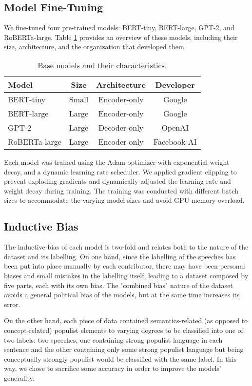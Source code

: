 \documentclass[11pt,twocolumn,letterpaper]{article}
\begin{document}
\subsection{Model Fine-Tuning}
We fine-tuned four pre-trained models: BERT-tiny, BERT-large, GPT-2, and RoBERTa-large. Table \ref{Table_1} provides an overview of these models, including their size, architecture, and the organization that developed them.

\begin{table}[H]
\begin{center}
\begin{tabular}{|l|c|c|c|}
\hline
Model & Size & Architecture & Developer\\
\hline\hline
BERT-tiny & Small & Encoder-only & Google\\
BERT-large & Large & Encoder-only & Google\\
GPT-2 & Large & Decoder-only & OpenAI\\
RoBERTa-large & Large & Encoder-only & Facebook AI\\
\hline
\end{tabular}
\end{center}
\caption{Base models and their characteristics.}
\label{Table_1}
\end{table}

Each model was trained using the Adam optimizer with exponential weight decay, and a dynamic learning rate scheduler. We applied gradient clipping to prevent exploding gradients and dynamically adjusted the learning rate and weight decay during training. The training was conducted with different batch sizes to accommodate the varying model sizes and avoid GPU memory overload.


\subsection{Inductive Bias}

The inductive bias of each model is two-fold and relates both to the nature of the dataset and its labelling.
On one hand, since the labelling of the speeches has been put into place manually by each contributor, there may have been personal biases and small mistakes in the labelling itself, leading to a dataset composed by five parts, each with its own bias. The "combined bias" nature of the dataset avoids a general political bias of the models, but at the same time increases its error.

On the other hand, each piece of data contained semantics-related (as opposed to concept-related) populist elements to varying degrees to be classified into one of two labels: two speeches, one containing strong populist language in each sentence and the other containing only some strong populist language but being conceptually strongly populist would be classified with the same label. In this way, we chose to sacrifice some accuracy in order to improve the models' generality.
\end{document}
